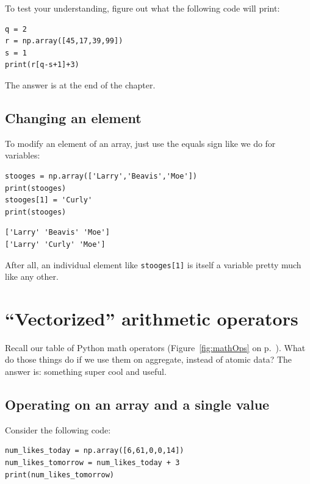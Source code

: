 To test your understanding, figure out what the following code will print:

\label{indexTest}
\begin{Verbatim}[fontsize=\small,samepage=true,frame=single,framesep=3mm]
q = 2
r = np.array([45,17,39,99])
s = 1
print(r[q-s+1]+3)
\end{Verbatim}

The answer is at the end of the chapter.

\subsection{Changing an element}

To modify an element of an array, just use the equals sign like we do for
variables:

\begin{Verbatim}[fontsize=\small,samepage=true,frame=single,framesep=3mm]
stooges = np.array(['Larry','Beavis','Moe'])
print(stooges)
stooges[1] = 'Curly'
print(stooges)
\end{Verbatim}

\begin{Verbatim}[fontsize=\small,samepage=true,frame=leftline,framesep=5mm,framerule=1mm]
['Larry' 'Beavis' 'Moe']
['Larry' 'Curly' 'Moe']
\end{Verbatim}

After all, an individual element like \texttt{stooges[1]} is itself a variable
pretty much like any other.


\section{``Vectorized'' arithmetic operators}

Recall our table of Python math operators (Figure~\ref{fig:mathOps} on
p.~\pageref{fig:mathOps}). What do those things do if we use them on aggregate,
instead of atomic data? The answer is: something super cool and useful.

\subsection{Operating on an array and a single value}

Consider the following code:

\label{vectorizedArrayIntExample}
\begin{Verbatim}[fontsize=\small,samepage=true,frame=single]
num_likes_today = np.array([6,61,0,0,14])
num_likes_tomorrow = num_likes_today + 3
print(num_likes_tomorrow)
\end{Verbatim}

